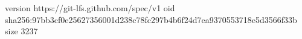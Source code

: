 version https://git-lfs.github.com/spec/v1
oid sha256:97bb3cf0e25627356001d238c78fc297b4b6f24d7ea9370553718e5d3566f33b
size 3237
